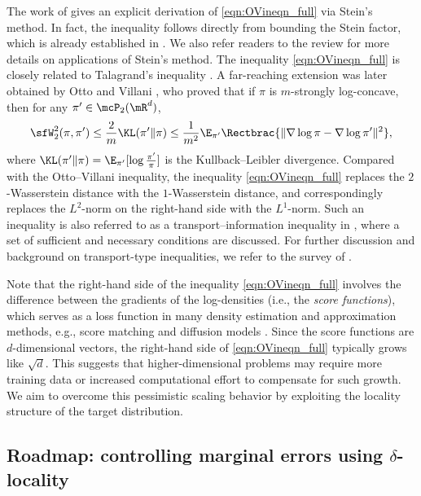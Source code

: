\documentclass[11pt]{article}
\begin{document}
The work of \cite{MR4583066} gives an explicit derivation of \eqref{eqn:OVineqn_full} via Stein's method. In fact, the inequality follows directly from bounding the Stein factor, which is already established in \cite{MR3548768,MR4019878}. 
We also refer readers to the review \cite{10.1214/22-STS863} for more details on applications of Stein's method.
%
The inequality \eqref{eqn:OVineqn_full} is closely related to Talagrand's inequality \cite{MR1392331}. A far-reaching extension was later obtained by Otto and Villani \cite{MR1760620}, who proved that if $\pi$ is $m$-strongly log-concave, then for any $\pi' \in \mcP_2(\mR^d)$,
\begin{equation}
    \sfW_2^2(\pi,\pi') \le \frac{2}{m} \KL(\pi'\|\pi) \le \frac{1}{m^2} \E_{\pi'} \Rectbrac{ \|\nabla \log \pi-\nabla \log \pi' \|^2 },
\end{equation}
where $\KL(\pi'\|\pi) = \E_{\pi'} [ \log \frac{\pi'}{\pi} ] $ is the Kullback--Leibler divergence.
%
Compared with the Otto--Villani inequality, the inequality \eqref{eqn:OVineqn_full} replaces the $2$-Wasserstein distance with the $1$-Wasserstein distance, and correspondingly replaces the $L^2$-norm on the right-hand side with the $L^1$-norm.
%
Such an inequality is also referred to as a transport--information inequality in \cite{Guillin2009,10.1214/19-AAP1530}, where a set of sufficient and necessary conditions are discussed.
%
For further discussion and background on transport-type inequalities, we refer to the survey of \cite{MR2895086}.



Note that the right-hand side of the inequality \eqref{eqn:OVineqn_full} involves the difference between the gradients of the log-densities (i.e., the \emph{score functions}), which serves as a loss function in many density estimation and approximation methods, e.g., score matching \cite{JMLR:v6:hyvarinen05a,NEURIPS2019_3001ef25} and diffusion models \cite{NEURIPS2020_4c5bcfec}.
%
Since the score functions are $d$-dimensional vectors, the right-hand side of \eqref{eqn:OVineqn_full} typically grows like $\sqrt{d}$. This suggests that higher-dimensional problems may require more training data or increased computational effort to compensate for such growth.
We aim to overcome this pessimistic scaling behavior by exploiting the locality structure of the target distribution.





\subsection{Roadmap: controlling marginal errors using \texorpdfstring{$\delta$}{delta}-locality}
\label{sec:roadmap}
\end{document}
